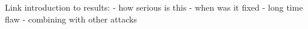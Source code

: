 Link introduction to results:
- how serious is this
- when was it fixed
- long time flaw
- combining with other attacks
